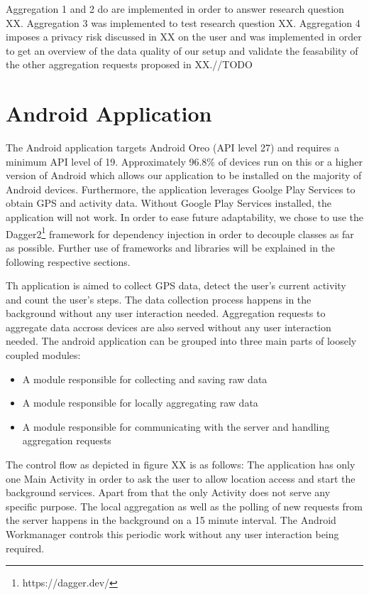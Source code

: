 Aggregation 1 and 2 do are implemented in order to answer research question XX. Aggregation 3 was implemented to test research question XX.
Aggregation 4 imposes a privacy risk discussed in XX on the user and was implemented in order to get an overview of the data quality of our setup and validate the feasability of the other aggregation requests proposed in XX.//TODO

\section{Android Application}
The Android application targets Android Oreo (API level 27) and requires a minimum API level of 19. Approximately 96.8\% of devices run on this or a higher version of Android \cite{android-api-level-share} which allows our application to be installed on the majority of Android devices.
Furthermore, the application leverages Goolge Play Services to obtain GPS and activity data. Without Google Play Services installed, the application will not work. In order to ease future adaptability, we chose to use the Dagger2\footnote{https://dagger.dev/} framework for dependency injection in order to decouple classes as far as possible. Further use of frameworks and libraries will be explained in the following respective sections.

Th application is aimed to collect GPS data, detect the user's current activity and count the user's steps. The data collection process happens in the background without any user interaction needed. Aggregation requests to aggregate data accross devices are also served without any user interaction needed.
The android application can be grouped into three main parts of loosely coupled modules:
\begin{itemize}
	\item A module responsible for collecting and saving raw data
	\item A module responsible for locally aggregating raw data
	\item A module responsible for communicating with the server and handling aggregation requests
\end{itemize}
The control flow as depicted in figure XX is as follows: 
The application has only one Main Activity in order to ask the user to allow location access and start the background services. Apart from that the only Activity does not serve any specific purpose. 
The local aggregation as well as the polling of new requests from the server happens in the background on a 15 minute interval. The Android Workmanager controls this periodic work without any user interaction being required.

